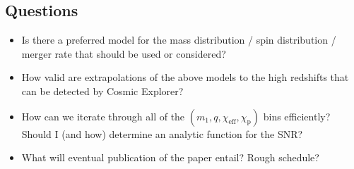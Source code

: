 \documentclass[10pt]{article}
\begin{document}
\begin{multicols*}{2}
\section{Questions}

\begin{itemize}
    \item Is there a preferred model for the mass distribution / spin distribution / merger rate that should be used or considered? 
    \item How valid are extrapolations of the above models to the high redshifts that can be detected by Cosmic Explorer?
    \item How can we iterate through all of the $(m_1, q, \chi_\text{eff}, \chi_\text{p})$ bins efficiently? Should I (and how) determine an analytic function for the SNR? 
    \item What will eventual publication of the paper entail? Rough schedule? 
\end{itemize}






\end{multicols*}
\end{document}
